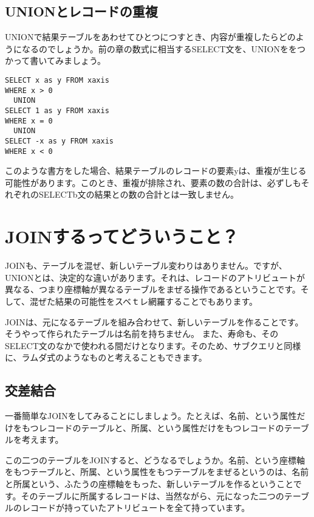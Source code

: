 \subsection{UNIONとレコードの重複}

UNIONで結果テーブルをあわせてひとつにつすとき、内容が重複したらどのようになるのでしょうか。前の章の数式に相当するSELECT文を、UNIONををつかって書いてみましょう。

\begin{verbatim}
SELECT x as y FROM xaxis
WHERE x > 0
  UNION
SELECT 1 as y FROM xaxis
WHERE x = 0
  UNION
SELECT -x as y FROM xaxis
WHERE x < 0
\end{verbatim}

このような書方をした場合、結果テーブルのレコードの要素yは、重複が生じる可能性があります。このとき、重複が排除され、要素の数の合計は、必ずしもそれぞれのSELECTb文の結果との数の合計とは一致しません。

\section{JOINするってどういうこと？}

JOINも、テーブルを混ぜ、新しいテーブル変わりはありません。ですが、UNIONとは、決定的な違いがあります。それは、レコードのアトリビュートが異なる、つまり座標軸が異なるテーブルをまぜる操作であるということです。そして、混ぜた結果の可能性をスベｔレ網羅することでもあります。

JOINは、元になるテーブルを組み合わせて、新しいテーブルを作ることです。そうやって作られたテーブルは名前を持ちません。
また、寿命も、そのSELECT文のなかで使われる間だけとなります。そのため、サブクエリと同様に、ラムダ式のようなものと考えることもできます。

\subsection{交差結合}

一番簡単なJOINをしてみることにしましょう。たとえば、名前、という属性だけをもつレコードのテーブルと、所属、という属性だけをもつレコードのテーブルを考えます。

この二つのテーブルをJOINすると、どうなるでしょうか。名前、という座標軸をもつテーブルと、所属、という属性をもつテーブルをまぜるというのは、名前と所属という、ふたうの座標軸をもった、新しいテーブルを作るということです。そのテーブルに所属するレコードは、当然ながら、元になった二つのテーブルのレコードが持っていたアトリビュートを全て持っています。

